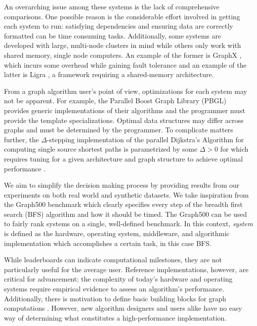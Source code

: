 \documentclass[conference]{IEEEtran}
\begin{document}
An overarching issue among these systems is the lack of comprehensive comparisons. One possible reason is the considerable effort involved in getting each system to run: satisfying dependencies and ensuring data are correctly formatted can be time consuming tasks. Additionally, some systems are developed with large, multi-node clusters in mind while others only work with shared memory, single node computers. An example of the former is GraphX \cite{Xin:2013:GraphX}, which incurs some overhead while gaining fault tolerance and an example of the latter is Ligra \cite{Shun:2013:Ligra}, a framework requiring a shared-memory architecture.

From a graph algorithm user's point of view, optimizations for each system may not be apparent. For example, the Parallel Boost Graph Library (PBGL)~\cite{Gregor:2005:PBGL} provides generic implementations of their algorithms and the programmer must provide the template specializations. Optimal data structures may differ across graphs and must be determined by the programmer. To complicate matters further, the $\Delta$-stepping implementation of the parallel Dijkstra's Algorithm for computing single source shortest paths is parametrized by some $\Delta > 0$ for which requires tuning for a given architecture and graph structure to achieve optimal performance \cite{Panitanarak:2014:SSSPPerf}. 

We aim to simplify the decision making process by providing results from our experiments on both real world and synthetic datasets. We take inspiration from the Graph500 benchmark \cite{Murphy:2010:Graph500} which clearly specifies every step of the breadth first search (BFS) algorithm and how it should be timed. The Graph500 can be used to fairly rank systems on a single, well-defined benchmark. In this context, \emph{system} is defined as the hardware, operating system, middleware, and algorithmic implementation which accomplishes a certain task, in this case BFS.

While leaderboards can indicate computational milestones, they are not particularly useful for the average user. Reference implementations, however, are critical for advancement; the complexity of today's hardware and operating systems require empirical evidence to assess an algorithm's performance. Additionally, there is motivation to define basic building blocks for graph computations \cite{GABB16, Buluc:CombBLAS:2011}. However, new algorithm designers and users alike have no easy way of determining what constitutes a high-performance implementation.
\end{document}
